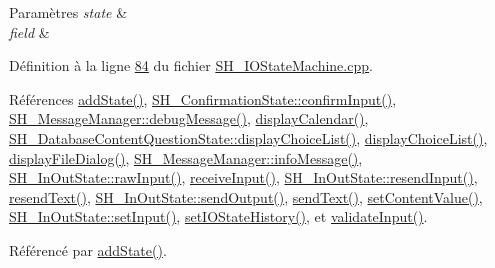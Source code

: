 \begin{DoxyParams}{Paramètres}
{\em state} & \\
\hline
{\em field} & \\
\hline
\end{DoxyParams}


Définition à la ligne \hyperlink{SH__IOStateMachine_8cpp_source_l00084}{84} du fichier \hyperlink{SH__IOStateMachine_8cpp_source}{S\-H\-\_\-\-I\-O\-State\-Machine.\-cpp}.



Références \hyperlink{classSH__InOutStateMachine_a3de9dedcdfd6efab868484c047638f71}{add\-State()}, \hyperlink{classSH__ConfirmationState_a039267260de5d102ac7511e6a5fae87f}{S\-H\-\_\-\-Confirmation\-State\-::confirm\-Input()}, \hyperlink{classSH__MessageManager_a379f2aa0a590a5add34dbe91f98b2ff7}{S\-H\-\_\-\-Message\-Manager\-::debug\-Message()}, \hyperlink{classSH__InOutStateMachine_ab3a12d1f9b658d8ffdc17669a6c065f2}{display\-Calendar()}, \hyperlink{classSH__DatabaseContentQuestionState_ae1e149ad7ab3d957f3c5df9ef078448b}{S\-H\-\_\-\-Database\-Content\-Question\-State\-::display\-Choice\-List()}, \hyperlink{classSH__InOutStateMachine_ab74b981b0aab09067d7479f2b7e79b0b}{display\-Choice\-List()}, \hyperlink{classSH__InOutStateMachine_abd206c3bc32bb7690df9c3e1cd546ebc}{display\-File\-Dialog()}, \hyperlink{classSH__MessageManager_a0b35c2f96e6d69934bf7f7c1e2172ea9}{S\-H\-\_\-\-Message\-Manager\-::info\-Message()}, \hyperlink{classSH__InOutState_a4c674a54f41d2e6ef951b22393dcd89f}{S\-H\-\_\-\-In\-Out\-State\-::raw\-Input()}, \hyperlink{classSH__InOutStateMachine_a037ed5e13ecfae2123a8d4940292e410}{receive\-Input()}, \hyperlink{classSH__InOutState_a1f00480afefd173002cf56d4c4128048}{S\-H\-\_\-\-In\-Out\-State\-::resend\-Input()}, \hyperlink{classSH__InOutStateMachine_a526822c66b46aa0cd81ba4473fa5573f}{resend\-Text()}, \hyperlink{classSH__InOutState_a77921c5f42059bc97361f4ff7827da12}{S\-H\-\_\-\-In\-Out\-State\-::send\-Output()}, \hyperlink{classSH__InOutStateMachine_a5e7f5958bae31696b6a8deab94ad2b4f}{send\-Text()}, \hyperlink{classSH__InOutStateMachine_a9ab1534306b2bdb62743d4bcefe40c17}{set\-Content\-Value()}, \hyperlink{classSH__InOutState_aaec9c2b5ef7c406bff7469461352d47c}{S\-H\-\_\-\-In\-Out\-State\-::set\-Input()}, \hyperlink{classSH__InOutStateMachine_acbcce2c4300af1634d928b30e5e9be1c}{set\-I\-O\-State\-History()}, et \hyperlink{classSH__InOutStateMachine_aec1b3fef3c1f82499aa1f73beaecd08a}{validate\-Input()}.



Référencé par \hyperlink{classSH__InOutStateMachine_a52469f4988c3eb654def2ed237fd10eb}{add\-State()}.



